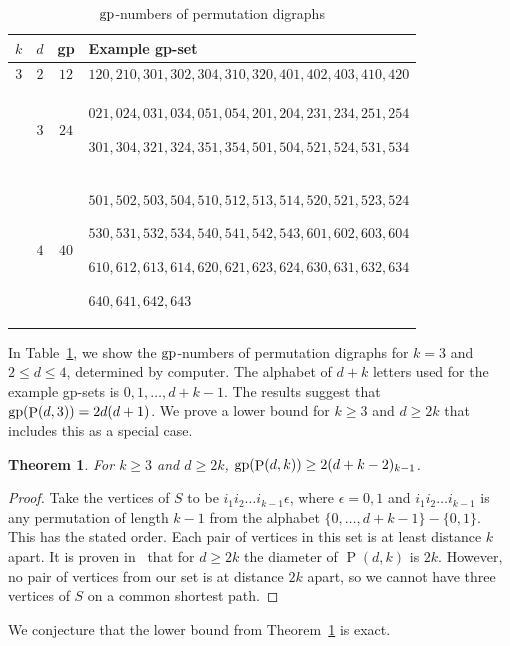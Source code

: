 \documentclass[a4paper,12pt]{article}
\newtheorem{theorem}{Theorem}[section]
\theoremstyle{definition}
\newcommand{\gp}{{\rm gp}}
\DeclareMathOperator{\Pe}{P}
\begin{document}
	
	\begin{table}
		\centering
		\begin{tabular}{|cccp{11cm}|}
			\hline
			$k$ & $d$ & gp & Example gp-set \\
			\hline
			$3$ & $2$ & $12$ & $120, 210, 301, 302, 304, 310, 320, 401, 402, 403, 410, 420$ \\
			& $3$ & $24$ & $021, 024, 031, 034, 051, 054, 201, 204, 231, 234, 251, 254$\par
			$301, 304, 321, 324, 351, 354, 501, 504, 521, 524, 531, 534$\\
			& $4$ & $40$ & $501, 502, 503, 504, 510, 512, 513, 514, 520, 521, 523, 524$\par
			$530, 531, 532, 534, 540, 541, 542, 543, 601, 602, 603, 604$\par
			$610, 612, 613, 614, 620, 621, 623, 624, 630, 631, 632, 634$\par
			$640, 641, 642, 643$\\
			\hline
		\end{tabular}
		\caption{$\gp $-numbers of permutation digraphs}
		\label{tab:permdigraph}
	\end{table}
	
	In Table~\ref{tab:permdigraph}, we show the $\gp $-numbers of permutation digraphs for $k = 3$ and $2 \leq d \leq 4$, determined by computer. The alphabet of $d+k$ letters used for the example gp-sets is $0,1,\ldots,d+k-1$. The results suggest that $\gp (\Pe (d,3)) = 2d(d+1)$. We prove a lower bound for $k \geq 3$ and $d \geq 2k$ that includes this as a special case.
	
	\begin{theorem}\label{thm:permutationlowerbound}
		For $k \geq 3$ and $d \geq 2k$, $\gp (\Pe (d,k)) \geq 2(d+k-2)_{k-1}$.
	\end{theorem}
	\begin{proof}
		Take the vertices of $S$ to be $i_1i_2\ldots i_{k-1}\epsilon $, where $\epsilon = 0,1$ and $i_1i_2\ldots i_{k-1}$ is any permutation of length $k-1$ from the alphabet $\{ 0,\ldots ,d+k-1\} -\{ 0,1\} $. This has the stated order. Each pair of vertices in this set is at least distance $k$ apart. It is proven in~\cite{Brunat} that for $d \geq 2k$ the diameter of $\Pe (d,k)$ is $2k$. However, no pair of vertices from our set is at distance $2k$ apart, so we cannot have three vertices of $S$ on a common shortest path.
	\end{proof}
	
	We conjecture that the lower bound from Theorem~\ref{thm:permutationlowerbound} is exact. 
	
\end{document}
